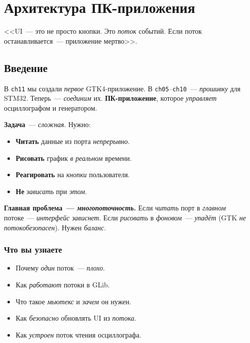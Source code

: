 
\chapter{Архитектура ПК-приложения}
\label{ch:pc-architecture}

\epigraph{<<UI~--- это не просто кнопки. Это \emph{поток}
событий. Если поток останавливается~--- приложение мертво>>.}{}

\section{Введение}
\label{sec:pc-intro}

В \texttt{ch11} мы создали \emph{первое} GTK4-приложение.
В \texttt{ch05}--\texttt{ch10}~--- \emph{прошивку} для
STM32. Теперь~--- \emph{соединим} их. \textbf{ПК-приложение},
которое \emph{управляет} осциллографом и генератором.

\textbf{Задача}~--- \emph{сложная}. Нужно:
\begin{itemize}
    \item \textbf{Читать} данные из порта \emph{непрерывно}.
    \item \textbf{Рисовать} график \emph{в} \emph{реальном} времени.
    \item \textbf{Реагировать} на \emph{кнопки} пользователя.
    \item \textbf{Не} \emph{зависать} при \emph{этом}.
\end{itemize}

\begin{ideabox}
\textbf{Главная проблема~--- \emph{многопоточность}.} Если \emph{читать}
порт в \emph{главном} потоке~--- \emph{интерфейс} \emph{зависнет}.
Если \emph{рисовать} в \emph{фоновом}~--- \emph{упадёт} (GTK
\emph{не} \emph{потокобезопасен}). Нужен \emph{баланс}.
\end{ideabox}

\subsection{Что вы узнаете}

\begin{itemize}
    \item Почему \emph{один} поток~--- \emph{плохо}.
    \item Как \emph{работают} потоки в GLib.
    \item Что такое \emph{мьютекс} и \emph{зачем} он нужен.
    \item Как \emph{безопасно} обновлять UI из \emph{потока}.
    \item Как \emph{устроен} поток чтения осциллографа.
\end{itemize}

